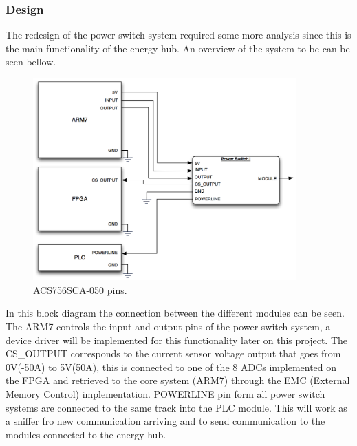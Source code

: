 \subsubsection{Design}
%
%
%
The redesign of the power switch system required some more analysis since this is the main functionality of the energy hub. 
An overview of the system to be can be seen bellow.
%
\begin{figure}[H]
	\begin{centering}
		\includegraphics[width=0.90\textwidth]{images/PS_BlockDiagram.png}
		\caption{ACS756SCA-050 pins.}
	\end{centering}
\end{figure}
%
In this block diagram the connection between the different modules can be seen. The ARM7 controls the input and output pins of the power switch system, a device driver will be implemented for this functionality later on this project. 
The CS\_OUTPUT corresponds to the current sensor voltage output that goes from 0V(-50A) to 5V(50A), this is connected to one of the 8 ADCs implemented on the FPGA and retrieved to the core system (ARM7) through the EMC (External Memory Control) implementation.
POWERLINE pin form all power switch systems are connected to the same track into the PLC module. This will work as a sniffer fro new communication arriving and to send communication to the modules connected to the energy hub.

